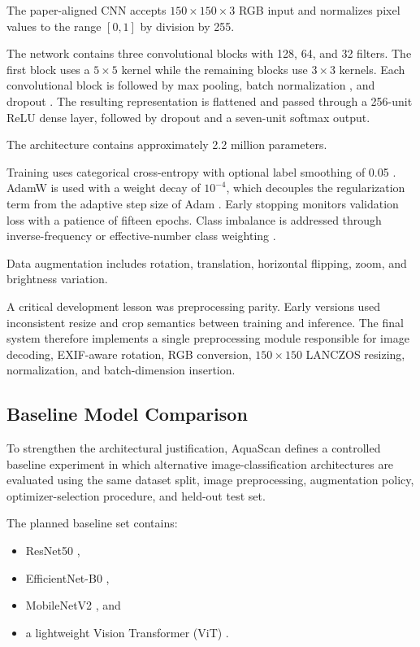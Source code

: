 \documentclass[conference]{IEEEtran}
\begin{document}
The paper-aligned CNN \cite{b1} accepts $150\times150\times3$ RGB input and normalizes pixel values to the range $[0,1]$ by division by 255.

The network contains three convolutional blocks with 128, 64, and 32 filters. The first block uses a $5\times5$ kernel while the remaining blocks use $3\times3$ kernels. Each convolutional block is followed by max pooling, batch normalization \cite{b28}, and dropout \cite{b27}. The resulting representation is flattened and passed through a 256-unit ReLU dense layer, followed by dropout and a seven-unit softmax output.

The architecture contains approximately 2.2 million parameters.

Training uses categorical cross-entropy with optional label smoothing of 0.05 \cite{b29}. AdamW \cite{b11} is used with a weight decay of $10^{-4}$, which decouples the regularization term from the adaptive step size of Adam \cite{b12}. Early stopping monitors validation loss with a patience of fifteen epochs. Class imbalance is addressed through inverse-frequency or effective-number class weighting \cite{b3}.

Data augmentation includes rotation, translation, horizontal flipping, zoom, and brightness variation.

A critical development lesson was preprocessing parity. Early versions used inconsistent resize and crop semantics between training and inference. The final system therefore implements a single preprocessing module responsible for image decoding, EXIF-aware rotation, RGB conversion, $150\times150$ LANCZOS resizing, normalization, and batch-dimension insertion.

\subsection{Baseline Model Comparison}

To strengthen the architectural justification, AquaScan defines a controlled baseline experiment in which alternative image-classification architectures are evaluated using the same dataset split, image preprocessing, augmentation policy, optimizer-selection procedure, and held-out test set.

The planned baseline set contains:

\begin{itemize}
    \item ResNet50 \cite{b8},
    \item EfficientNet-B0 \cite{b9},
    \item MobileNetV2 \cite{b7}, and
    \item a lightweight Vision Transformer (ViT) \cite{b10}.
\end{itemize}
\end{document}
